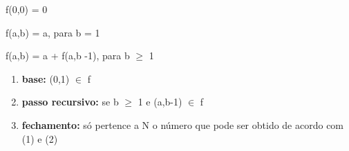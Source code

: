 \begin{question}
	f(0,0) = 0
	
	f(a,b) = a, para b = 1
	
	f(a,b) = a + f(a,b -1), para b $\geq$ 1
   \begin{enumerate}
   		\item \textbf{base:} (0,1) $\in$ f
   		\item \textbf{passo recursivo:} se b $\geq$ 1 e (a,b-1) $\in$ f 
   		\item \textbf{fechamento:} só pertence a N o número que pode ser obtido de acordo
   		com (1) e (2)
   \end{enumerate}
\end{question}
